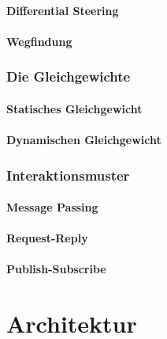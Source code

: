\documentclass[ngerman]{scrartcl}
\begin{document}
\subsection{Differential Steering}\label{diffs}
\subsection{Wegfindung}
\section{Die Gleichgewichte}
\subsection{Statisches Gleichgewicht}
\subsection{Dynamischen Gleichgewicht}
\section{Interaktionsmuster}
\subsection{Message Passing}
\subsection{Request-Reply}
\subsection{Publish-Subscribe}


\part{Architektur}
%
\end{document}
